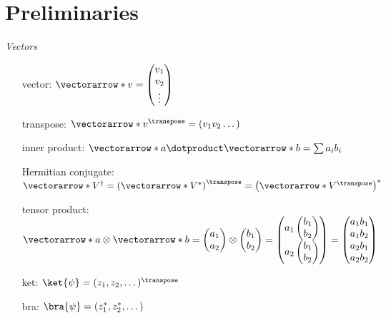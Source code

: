 \section*{Preliminaries}
\emph{Vectors}
\begin{itemize}
  \item [vector:] $\vectorarrow*{v}=\begin{pmatrix}v_1\\v_2\\ \vdots \end{pmatrix}$
  \item [transpose:] $\vectorarrow*{v}^\transpose=(v_1 v_2 \dotsc)$
  \item [inner product:] $\vectorarrow*{a} \dotproduct \vectorarrow*{b} =
    \sum a_ib_i$
  \item [Hermitian conjugate:] $\vectorarrow*{V}^\dagger =
    \left(\vectorarrow*{V}^*\right)^\transpose =
    \left(\vectorarrow*{V}^\transpose\right)^*$
  \item [tensor product:] $%
    \vectorarrow*{a} \otimes \vectorarrow*{b} = %
    \begin{pmatrix}a_1\\a_2\end{pmatrix}%
    \otimes %
    \begin{pmatrix}b_1\\b_2\end{pmatrix}%
    = \begin{pmatrix}a_1\begin{pmatrix}b_1\\b_2\end{pmatrix}
\\a_2\begin{pmatrix}b_1\\b_2\end{pmatrix}\end{pmatrix}
    = \begin{pmatrix}
      a_1b_1\\a_1b_2\\a_2b_1\\a_2b_2\end{pmatrix}
    $
  \item [ket:] $\ket{\psi} = (z_1, z_2, \dotsc)^\transpose$
  \item [bra:] $\bra{\psi} = (z^*_1, z^*_2, \dotsc)$
\end{itemize}

\subsection*{}
